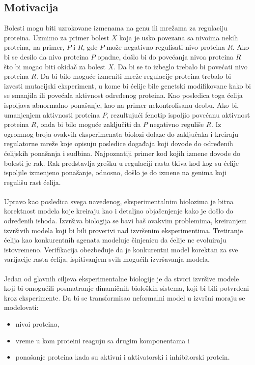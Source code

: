 \documentclass[a4paper]{article}
\begin{document}
\subsection{Motivacija}
Bolesti mogu biti uzrokovane izmenama na genu ili mrežama za regulaciju proteina. Uzmimo za primer bolest $X$ koja je usko povezana sa nivoima nekih proteina, na primer, $P$ i $R$, gde $P$ može negativno regulisati nivo proteina $R$. Ako bi se desilo da nivo proteina $P$ opadne, došlo bi do povećanja nivoa proteina $R$ što bi mogao biti okidač za bolest $X$. Da bi se to izbeglo trebalo bi povećati nivo proteina $R$. Da bi bilo moguće izmeniti mreže regulacije proteina trebalo bi izvesti mutacijski eksperiment, u kome bi ćelije bile genetski modifikovane kako bi se smanjila ili povećala aktivnost određenog proteina. Kao posledica toga ćelija ispoljava abnormalno ponašanje, kao na primer nekontrolisanu deobu. Ako bi, umanjenjem aktivnosti proteina $P$, rezultujući fenotip ispoljio povećanu aktivnost proteina $R$, onda bi bilo moguće zaključiti da $P$ negativno reguliše $R$. Iz ogromnog broja ovakvih eksperimenata biolozi dolaze do zaključaka i kreiraju regulatorne mreže koje opisuju posledice događaja koji dovode do određenih ćelijskih ponašanja i sudbina. Najpoznatiji primer kod kojih izmene dovode do bolesti je rak. Rak predstavlja grešku u regulaciji rasta tkiva kod kog su ćelije ispoljile izmenjeno ponašanje, odnosno, došlo je do izmene na genima koji regulišu rast ćelija.\\\\

Upravo kao posledica svega navedenog, eksperimentalnim biolozima je bitna korektnost modela koje kreiraju kao i detaljno objašenjenje kako je došlo do određenih ishoda. Izvršiva biologija se bavi baš ovakvim problemima, kreiranjem izvršivih modela koji bi bili proverivi nad izvršenim eksperimentima. Tretiranje ćelija kao konkurentnih agenata modeluje činjenicu da ćelije ne evoluiraju istovremeno. Verifikacija obezbeđuje da je konkurentni model korektan za sve varijacije rasta ćelija, ispitivanjem svih mogućih izvršavanja modela.\\\\
Jedan od glavnih ciljeva eksperimentalne biologije je da stvori izvršive modele koji bi omogućili posmatranje dinamičnih bioloških sistema, koji bi bili potvrđeni kroz eksperimente. Da bi se transformisao neformalni model u izvršni moraju se modelovati:
\begin{itemize}
\item nivoi proteina,
\item vreme u kom proteini reaguju sa drugim komponentama i
\item ponašanje proteina kada su aktivni i aktivatorski i inhibitorski protein.
\end{itemize}
\end{document}
